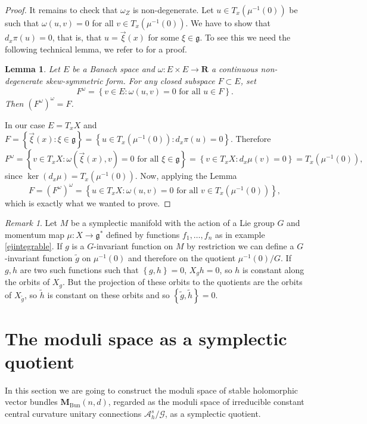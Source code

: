 \documentclass[12pt,a4paper]{book}
\newtheorem{lema}[thm]{Lemma}
\theoremstyle{definition} \newtheorem{defn}[thm]{Definition}
\theoremstyle{definition} \newtheorem{ejemplo}[thm]{Example}
\theoremstyle{remark} \newtheorem{rem}[thm]{Remark}
\def\AA{\mathscr{A}}
\def\GG{\mathscr{G}}
\def\gg{\mathfrak{g}}
\def\RR{\mathbf{R}}
\def\Bun{\mathbf{M}_{\mathrm{Bun}}}
\begin{document}
\begin{proof}
      It remains to check that $\omega_Z$ is non-degenerate. Let $u\in T_x(\mu^{-1}(0))$ be such that $\omega(u,v)=0$ for all $v\in T_x(\mu^{-1}(0))$. We have to show that $d_x\pi(u)=0$, that is, that $u=\vec{\xi}(x)$ for some $\xi\in \gg$. To see this we need the following technical lemma, we refer to \cite{kobayashi} for a proof.
      \begin{lema}
	Let $E$ be a Banach space and $\omega:E\times E \rightarrow \RR$ a continuous non-degenerate skew-symmetric form. For any closed subspace $F\subset E$, set
	\begin{equation*}
	  F^\omega=\left\{ v\in E:\omega(u,v)=0 \text{ for all } u \in F \right\}.
	\end{equation*}
	Then $(F^\omega)^\omega=F$.
      \end{lema}

      In our case $E=T_xX$ and $F=\left\{ \vec{\xi}(x) : \xi \in \gg \right\}=\left\{ u \in T_x(\mu^{-1}(0)) : d_x\pi(u)=0 \right\}$. Therefore
      \begin{equation*}
	F^\omega=\left\{ v\in T_xX: \omega(\vec{\xi}(x),v)=0 \text{ for all } \xi \in \gg \right\}=\left\{ v\in T_xX: d_x\mu(v)=0 \right\}=T_x(\mu^{-1}(0)),
      \end{equation*}
      since $\ker(d_x\mu)=T_x(\mu^{-1}(0))$. Now, applying the Lemma
      \begin{equation*}
	F=(F^\omega)^\omega=\left\{ u\in T_x X: \omega(u,v)=0 \text{ for all } v\in T_x(\mu^{-1}(0)) \right\},
      \end{equation*}
     which is exactly what we wanted to prove.
    \end{proof}

    \begin{rem}
      Let $M$ be a symplectic manifold with the action of a Lie group $G$ and momentum map $\mu:X\rightarrow \gg^*$ defined by functions $f_1,\dots,f_n$ as in example \ref{ejintegrable}. If $g$ is a $G$-invariant function on $M$ by restriction we can define a $G$-invariant function $\tilde{g}$ on $\mu^{-1}(0)$ and therefore on the quotient $\mu^{-1}(0)/G$. If $g,h$ are two such functions such that $\left\{ g,h \right\}=0$, $X_gh=0$, so $h$ is constant along the orbits of $X_g$. But the projection of these orbits to the quotients are the orbits of $X_{\tilde{g}}$, so $\tilde{h}$ is constant on these orbits and so $\left\{ \tilde{g},\tilde{h} \right\}=0$.
    \end{rem}

    \section{The moduli space as a symplectic quotient}
In this section we are going to construct the moduli space of stable holomorphic vector bundles $\Bun(n,d)$, regarded as the moduli space of irreducible constant central curvature unitary connections $\AA^s_h/\GG$, as a symplectic quotient. 
\end{document}
